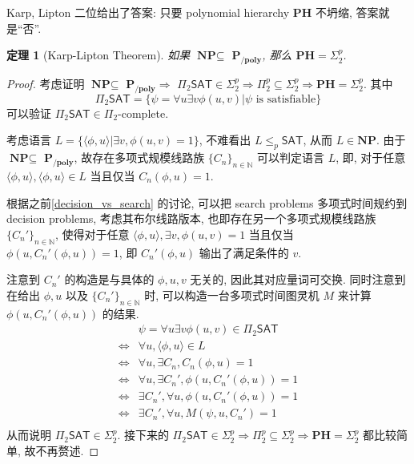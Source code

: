\documentclass[8pt]{article}
\theoremstyle{compact}
\newtheorem{theorem}{定理}[section]
\def\le{\leqslant}
\def\NP{\textbf{NP}}
\def\PH{\textbf{PH}}
\def\PPOLY{$\textbf{P}_{\textbf{/poly}}$}
\begin{document}
Karp, Lipton 二位给出了答案: 只要 polynomial hierarchy $\PH$ 不坍缩, 答案就是“否”.
\begin{theorem}[Karp-Lipton Theorem]
	如果 $\NP \subseteq $ \PPOLY, 那么 $\PH = \Sigma_2^p$.
\end{theorem}
\begin{proof}
	考虑证明 $\NP \subseteq$ \PPOLY $\Rightarrow$ $\Pi_2\textsf{SAT} \in \Sigma_2^p \Rightarrow \Pi_2^p \subseteq \Sigma_2^p \Rightarrow \PH = \Sigma_2^p$. 其中 $$\Pi_2\textsf{SAT} = \{\psi = \forall u\exists v \phi(u, v) | \psi \text{ is satisfiable}\}$$可以验证 $\Pi_2\textsf{SAT} \in \Pi_2$-complete.

	考虑语言 $L = \{\langle \phi, u \rangle | \exists v, \phi(u, v) = 1\}$, 不难看出 $L \le_p \textsf{SAT}$, 从而 $L \in \NP$. 由于 $\NP \subseteq $ \PPOLY, 故存在多项式规模线路族 $\{C_n\}_{n \in \mathbb N}$ 可以判定语言 $L$, 即, 对于任意 $\langle \phi, u \rangle, \langle \phi, u \rangle \in L$ 当且仅当 $C_{n}(\phi, u) = 1$.

	根据之前\cref{decision_vs_search} 的讨论, 可以把 search problems 多项式时间规约到 decision problems, 考虑其布尔线路版本, 也即存在另一个多项式规模线路族 $\{C_n'\}_{n \in \mathbb N}$, 使得对于任意 $\langle \phi, u \rangle, \exists v, \phi(u, v) = 1$ 当且仅当 $\phi(u, C_{n}'(\phi, u)) = 1$, 即 $C_{n}'(\phi, u)$ 输出了满足条件的 $v$.

	注意到 $C_n'$ 的构造是与具体的 $\phi, u, v$ 无关的, 因此其对应量词可交换. 同时注意到在给出 $\phi, u$ 以及 $\{C_n'\}_{n \in \mathbb N}$ 时, 可以构造一台多项式时间图灵机 $M$ 来计算 $\phi(u, C_{n}'(\phi, u))$ 的结果.
	\begin{equation*}
		\begin{split}
			& \psi = \forall u \exists v \phi(u, v) \in \Pi_2\textsf{SAT}\\
			\Leftrightarrow & \forall u, \langle \phi, u \rangle \in L\\
			\Leftrightarrow & \forall u, \exists C_n, C_n(\phi, u) = 1\\
			\Leftrightarrow & \forall u, \exists C_n', \phi(u, C_{n}'(\phi, u)) = 1\\
			\Leftrightarrow & \exists C_n', \forall u, \phi(u, C_{n}'(\phi, u)) = 1\\
			\Leftrightarrow & \exists C_n', \forall u, M(\psi, u, C_n') = 1\\
		\end{split}
	\end{equation*}
	从而说明 $\Pi_2\textsf{SAT} \in \Sigma_2^p$. 接下来的 $\Pi_2\textsf{SAT} \in \Sigma_2^p \Rightarrow \Pi_2^p \subseteq \Sigma_2^p \Rightarrow \PH = \Sigma_2^p$ 都比较简单, 故不再赘述.
\end{proof}
\end{document}
